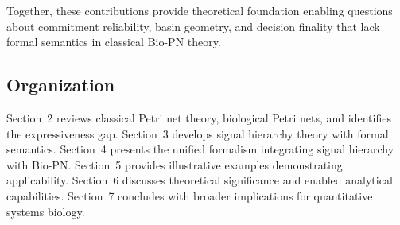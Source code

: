 \noindent Together, these contributions provide theoretical foundation enabling questions about commitment reliability, basin geometry, and decision finality that lack formal semantics in classical Bio-PN theory.

\subsection{Organization}

Section~2 reviews classical Petri net theory, biological Petri nets, and identifies the expressiveness gap. Section~3 develops signal hierarchy theory with formal semantics. Section~4 presents the unified formalism integrating signal hierarchy with Bio-PN. Section~5 provides illustrative examples demonstrating applicability. Section~6 discusses theoretical significance and enabled analytical capabilities. Section~7 concludes with broader implications for quantitative systems biology.
